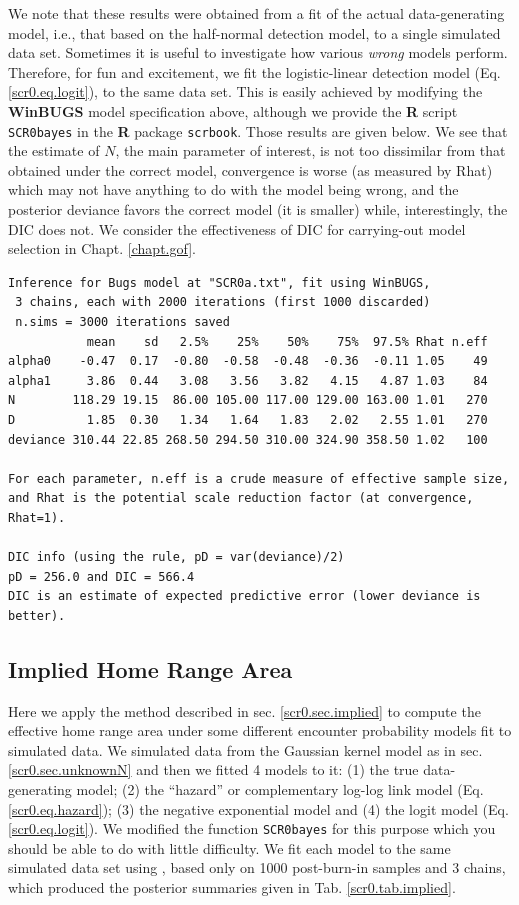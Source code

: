 We note that these results were obtained from a fit of the
actual data-generating model, 
i.e., that based on the half-normal detection model, to a single
simulated data set. Sometimes it is useful to investigate how various
{\it wrong} models perform.
Therefore, for fun and excitement, we fit the
 logistic-linear detection model
(Eq. \ref{scr0.eq.logit}),
to the same  
data set. This is easily achieved by modifying the {\bf WinBUGS} model
specification above, although we provide the {\bf R} script
\mbox{\tt SCR0bayes}  in the
{\bf R} package \mbox{\tt scrbook}.
Those results are given below. We see that the estimate of
$N$, the main parameter of interest, is not too dissimilar from that obtained
under the correct model, convergence is worse (as measured by Rhat)
which may not have anything to do with the model being wrong,
and the posterior deviance favors the correct model (it is smaller)
while, interestingly, the DIC does not. 
We consider 
 the effectiveness of DIC for carrying-out model selection in Chapt. 
\ref{chapt.gof}.
{\small
\begin{verbatim}
Inference for Bugs model at "SCR0a.txt", fit using WinBUGS,
 3 chains, each with 2000 iterations (first 1000 discarded)
 n.sims = 3000 iterations saved
           mean    sd   2.5%    25%    50%    75%  97.5% Rhat n.eff
alpha0    -0.47  0.17  -0.80  -0.58  -0.48  -0.36  -0.11 1.05    49
alpha1     3.86  0.44   3.08   3.56   3.82   4.15   4.87 1.03    84
N        118.29 19.15  86.00 105.00 117.00 129.00 163.00 1.01   270
D          1.85  0.30   1.34   1.64   1.83   2.02   2.55 1.01   270
deviance 310.44 22.85 268.50 294.50 310.00 324.90 358.50 1.02   100

For each parameter, n.eff is a crude measure of effective sample size,
and Rhat is the potential scale reduction factor (at convergence, Rhat=1).

DIC info (using the rule, pD = var(deviance)/2)
pD = 256.0 and DIC = 566.4
DIC is an estimate of expected predictive error (lower deviance is better).
\end{verbatim}
}


\subsection{Implied Home Range Area}

Here we apply the method described in sec. \ref{scr0.sec.implied} to
compute the effective home range area under some different encounter
probability models fit to simulated data. 
We simulated data from the Gaussian kernel model as in 
sec. \ref{scr0.sec.unknownN} and then we fitted 4 models to it: (1)
the true data-generating model; (2) the ``hazard'' or complementary log-log link 
model (Eq. \ref{scr0.eq.hazard}); (3) the negative exponential model
and (4) the logit model (Eq. \ref{scr0.eq.logit}).
We modified the function \mbox{\tt  SCR0bayes} for this purpose which
you should be able to do with little difficulty. We fit each model to
the same simulated  data set using \winbugs, based only on 1000
post-burn-in samples and 3 chains, which produced the posterior
summaries given in Tab. \ref{scr0.tab.implied}.


